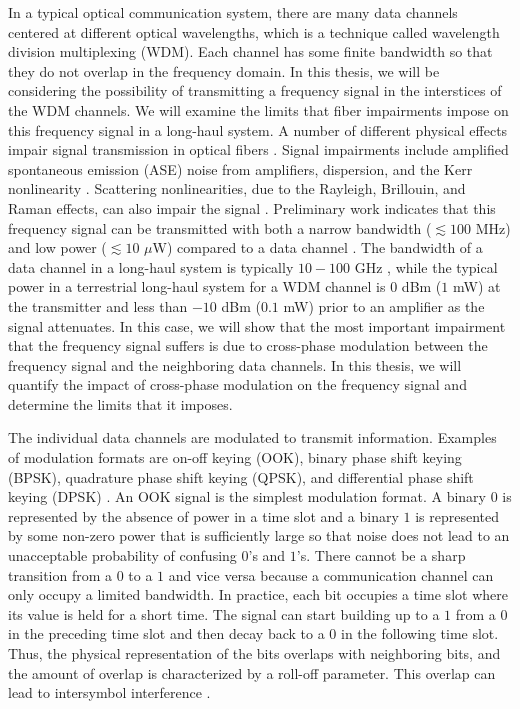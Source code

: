 In a typical optical communication system, there are many data channels centered at different optical wavelengths, which is a technique called wavelength division multiplexing (WDM).  Each channel has some finite bandwidth so that they do not overlap in the frequency domain.  In this thesis, we will be considering the possibility of transmitting a frequency signal in the interstices of the WDM channels. We will examine the limits that fiber impairments impose on this frequency signal in a long-haul system.  A number of different physical effects impair signal transmission in optical fibers \cite{agrawal2012fiber}. Signal impairments include amplified spontaneous emission (ASE) noise from amplifiers, dispersion, and the Kerr nonlinearity \cite{agrawal2012fiber}.  Scattering nonlinearities, due to the Rayleigh, Brillouin, and Raman effects, can also impair the signal \cite{agrawal2012fiber,Agrawal2013}.  Preliminary work indicates that this frequency signal can be transmitted with both a narrow bandwidth ($\lesssim 100$ MHz) and low power ($\lesssim 10$ $\mu$W) compared to a data channel \cite{menyukIFCS2015}.  The bandwidth of a data channel in a long-haul system is typically $10-100$ GHz \cite{ITU-T2012}, while the typical power in a terrestrial long-haul system for a WDM channel is $0$ dBm ($1$ mW) at the transmitter and less than $-10$ dBm ($0.1$ mW) prior to an amplifier as the signal attenuates.  In this case, we will show that the most important impairment that the frequency signal suffers is due to cross-phase modulation between the frequency signal and the neighboring data channels.  In this thesis, we will quantify the impact of cross-phase modulation on the frequency signal and determine the limits that it imposes.


The individual data channels are modulated to transmit information.  Examples of modulation formats are on-off keying (OOK), binary phase shift keying (BPSK), quadrature phase shift keying (QPSK), and differential phase shift keying (DPSK) \cite{agrawal2012fiber}.  An OOK signal is the simplest modulation format. A binary $0$ is represented by the absence of power in a time slot and a binary $1$ is represented by some non-zero power that is sufficiently large so that noise does not lead to an unacceptable probability of confusing $0$'s and $1$'s.  There cannot be a sharp transition from a $0$ to a $1$ and vice versa because a communication channel can only occupy a limited bandwidth.  In practice, each bit occupies a time slot where its value is held for a short time.  The signal can start building up to a $1$ from a $0$ in the preceding time slot and then decay back to a $0$ in the following time slot. Thus, the physical representation of the bits overlaps with neighboring bits, and the amount of overlap is characterized by a roll-off parameter.  This overlap can lead to intersymbol interference \cite{proakis2001digital}.

